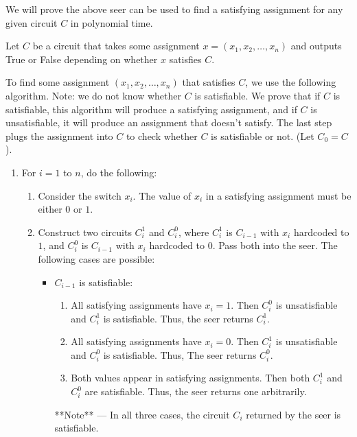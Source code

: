 \documentclass[12pt]{article}
\begin{document}
\begin{solution}
    \bbni
    
    We will prove the above seer can be used to find a satisfying assignment 
    for any given circuit $C$ in polynomial time.

    Let $C$ be a circuit that takes some assignment $x = (x_1, x_2, \ldots, x_n)$ 
    and outputs True or False depending on whether $x$ satisfies $C$.

    To find some assignment $(x_1, x_2, \ldots, x_n)$ that satisfies $C$, 
    we use the following algorithm. Note: we do not know whether 
    $C$ is satisfiable. We prove that if $C$ is satisfiable, this algorithm will 
    produce a satisfying assignment, and if $C$ is unsatisfiable, it will produce an assignment that doesn't satisfy. The last step plugs the assignment into $C$ to check whether $C$ is satisfiable or not. (Let $C_0 = C$).

    \begin{enumerate}
        \item For $i = 1$ to $n$, do the following:
        \begin{enumerate}
            \item[(a)] Consider the switch $x_i$. The value of $x_i$ in a satisfying assignment 
            must be either  $0$ or $1$.

            \item[(b)] Construct two circuits $C_i^1$ and $C_i^0$, where $C_i^1$ 
            is $C_{i-1}$ with $x_i$ hardcoded to $1$, and $C_i^0$ is $C_{i-1}$ 
            with $x_i$ hardcoded to $0$. Pass both into the seer. The following 
            cases are possible:

            \begin{itemize}
                \item $C_{i-1}$ is satisfiable:
                \begin{enumerate}
                    \item[1.] All satisfying assignments have $x_i = 1$. Then $C_i^0$ is unsatisfiable and $C_i^1$ is satisfiable. Thus, the seer returns $C_i^1$.
                    \item[2.] All satisfying assignments have $x_i = 0$. Then $C_i^1$ is unsatisfiable and $C_i^0$ is satisfiable. 
                    Thus, The seer returns $C_i^0$.
                    \item[3.] Both values appear in satisfying assignments. Then both 
                    $C_i^1$ and $C_i^0$ are satisfiable. Thus, the seer returns 
                    one arbitrarily.
                \end{enumerate}
                **Note** — In all three cases, the circuit $C_i$ returned by the seer is satisfiable.


\end{itemize}
\end{enumerate}
\end{enumerate}
\end{solution}
\end{document}
